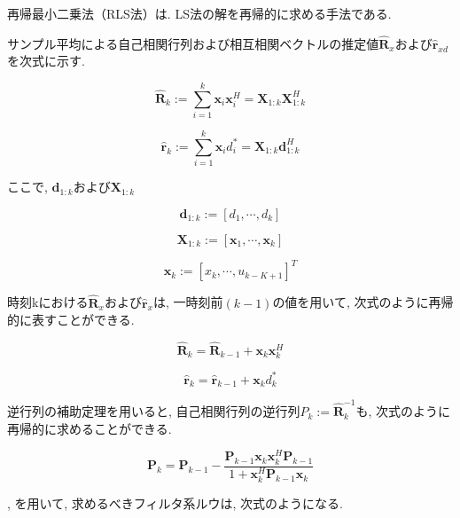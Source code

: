 再帰最小二乗法（RLS法）は. LS法の解を再帰的に求める手法である. 

サンプル平均による自己相関行列および相互相関ベクトルの推定値\(\hat{\bm{R}}_x\)および\(\hat{\bm{r}}_{xd}\)を次式に示す. 

\begin{equation}
\hat{\bm{R}}_k := \sum_{i=1}^k \bm{x}_i \bm{x}_i^H = \bm{X}_{1:k} \bm{X}_{1:k}^H
\end{equation}

\begin{equation}
\hat{\bm{r}}_k := \sum_{i=1}^k \bm{x}_i d_i^* = \bm{X}_{1:k} \bm{d}_{1:k}^H
\end{equation}

ここで, \(\bm{d}_{1:k}\)および\(\bm{X}_{1:k}\)

\begin{equation}
\bm{d}_{1:k} := [d_1, \cdots, d_k]
\end{equation}

\begin{equation}
\bm{X}_{1:k} := [\bm{x}_1, \cdots, \bm{x}_k]
\end{equation}

\begin{equation}
\bm{x}_{k} := [x_k, \cdots, u_{k-K+1}]^T
\end{equation}

時刻kにおける\(\hat{\bm{R}}_x\)および\(\hat{\bm{r}}_x\)は, 一時刻前\((k-1)\)の値を用いて, 次式のように再帰的に表すことができる. 


\begin{equation}
\hat{\bm{R}}_k = \hat{\bm{R}}_{k-1} + \bm{x}_k \bm{x}_k^H
\end{equation}


\begin{equation}
\hat{\bm{r}}_k = \hat{\bm{r}}_{k-1} + \bm{x}_k d_k^*
\label{equ:hat_r}
\end{equation}

逆行列の補助定理を用いると, 自己相関行列の逆行列\(P_k := \hat{\bm{R}}_k^{-1}\)も, 次式のように再帰的に求めることができる. 


\begin{equation}
\bm{P}_k = \bm{P}_{k-1} - \frac{\bm{P}_{k-1} \bm{x}_k \bm{x}_k^H \bm{P}_{k-1}}{1 + \bm{x}_k^H \bm{P}_{k-1} \bm{x}_k} 
\label{equ:P_k_inv_R}
\end{equation}

, 
を用いて, 求めるべきフィルタ系ルウは, 次式のようになる. 

